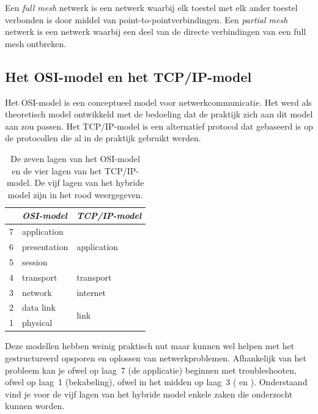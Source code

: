 Een \emph{full mesh} netwerk is een netwerk waarbij elk toestel met elk ander toestel verbonden is door middel van point-to-pointverbindingen.
Een \emph{partial mesh} netwerk is een netwerk waarbij een deel van de directe verbindingen van een full mesh ontbreken.

\subsection{Het OSI-model en het TCP/IP-model}

Het OSI-model is een conceptueel model voor netwerkcommunicatie.
Het werd als theoretisch model ontwikkeld met de bedoeling dat de praktijk zich aan dit model aan zou passen.
Het TCP/IP-model is een alternatief protocol dat gebaseerd is op de protocollen die al in de praktijk gebruikt werden.

\begin{table}[htp]
   \centering
   \begin{tabular}{rll}
   \toprule
     & \textit{OSI-model} & \textit{TCP/IP-model} \\
   \midrule
   7 & application & \multirow{3}{*}{\textcolor{spot1}{application}} \\
   6 & presentation & \\
   5 & session & \\[1ex]
   4 & \textcolor{spot1}{transport} & transport \\[1ex]
   3 & \textcolor{spot1}{network} & internet \\[1ex]
   2 & \textcolor{spot1}{data link} & \multirow{2}{*}{link} \\
   1 & \textcolor{spot1}{physical} & \\
   \bottomrule
   \end{tabular}
   \caption{De zeven lagen van het OSI-model en de vier lagen van het TCP/IP-model.
   De vijf lagen van het hybride model zijn in het rood weergegeven.}
   \label{tab:osi-model}
\end{table}

Deze modellen hebben weinig praktisch nut maar kunnen wel helpen met het gestructureerd opsporen en oplossen van netwerkproblemen.
Afhankelijk van het probleem kan je ofwel op laag~7 (de applicatie) beginnen met troubleshooten, ofwel op laag~1 (bekabeling), ofwel in het midden op laag~3 ( en ).
Onderstaand vind je voor de vijf lagen van het hybride model enkele zaken die onderzocht kunnen worden.

